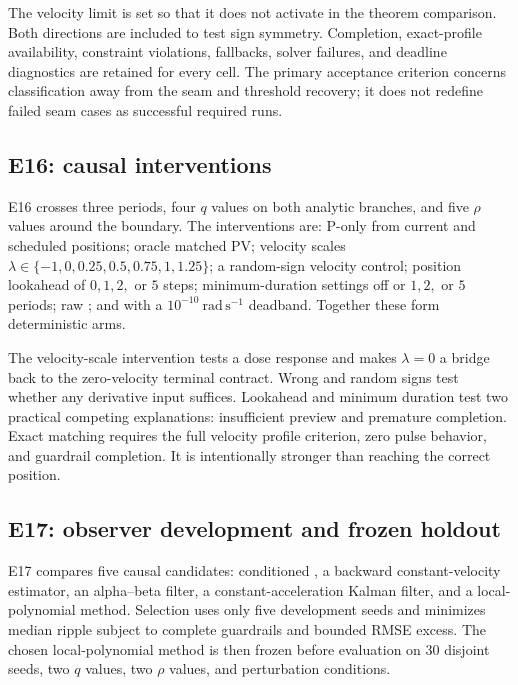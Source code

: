 The velocity limit is set so that it does not activate in the theorem comparison. Both directions are included to test sign symmetry. Completion, exact-profile availability, constraint violations, fallbacks, solver failures, and deadline diagnostics are retained for every cell. The primary acceptance criterion concerns classification away from the seam and threshold recovery; it does not redefine failed seam cases as successful required runs.

\subsection{E16: causal interventions}

E16 crosses three periods, four $q$ values on both analytic branches, and five $\rho$ values around the boundary. The interventions are: P-only from current and scheduled positions; oracle matched PV; velocity scales $\lambda\in\{-1,0,0.25,0.5,0.75,1,1.25\}$; a random-sign velocity control; position lookahead of $0,1,2,$ or $5$ steps; minimum-duration settings off or $1,2,$ or $5$ periods; raw \FutureOOne{}; and \FutureOOne{} with a $10^{-10}\ \mathrm{rad\,s^{-1}}$ deadband. Together these form \ESixteenArmCount{} deterministic arms.

The velocity-scale intervention tests a dose response and makes $\lambda=0$ a bridge back to the zero-velocity terminal contract. Wrong and random signs test whether any derivative input suffices. Lookahead and minimum duration test two practical competing explanations: insufficient preview and premature completion. Exact matching requires the full velocity profile criterion, zero pulse behavior, and guardrail completion. It is intentionally stronger than reaching the correct position.

\subsection{E17: observer development and frozen holdout}

E17 compares five causal candidates: conditioned \FutureOOne{}, a backward constant-velocity estimator, an alpha--beta filter, a constant-acceleration Kalman filter, and a local-polynomial method. Selection uses only five development seeds and minimizes median ripple subject to complete guardrails and bounded RMSE excess. The chosen local-polynomial method is then frozen before evaluation on 30 disjoint seeds, two $q$ values, two $\rho$ values, and perturbation conditions.

